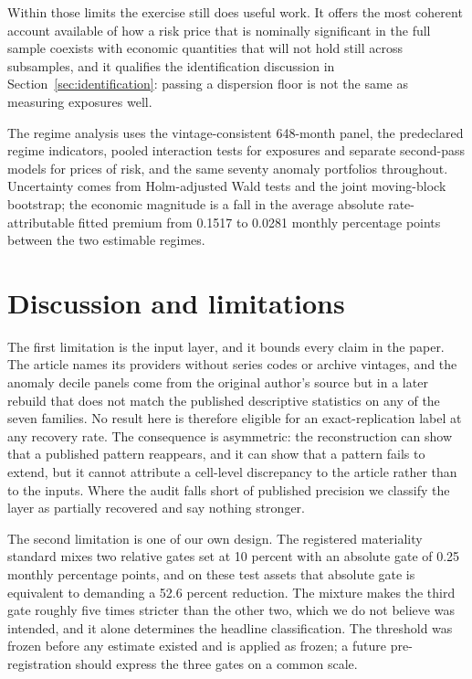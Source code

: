 \documentclass[11pt]{article}
\begin{document}
Within those limits the exercise still does useful work. It offers the most
coherent account available of how a risk price that is nominally significant in
the full sample coexists with economic quantities that will not hold still across
subsamples, and it qualifies the identification discussion in
Section~\ref{sec:identification}: passing a dispersion floor is not the same as
measuring exposures well.

The regime analysis uses the vintage-consistent 648-month panel, the predeclared %
regime indicators, pooled interaction tests for exposures and separate
second-pass models for prices of risk, and the same seventy anomaly portfolios
throughout. Uncertainty comes from Holm-adjusted Wald tests and the joint
moving-block bootstrap; the economic magnitude is a fall in the average absolute
rate-attributable fitted premium from 0.1517 to 0.0281 monthly percentage points %
between the two estimable regimes. %

\section{Discussion and limitations}
\label{sec:discussion}

The first limitation is the input layer, and it bounds every claim in the paper.
The article names its providers without series codes or archive vintages, and the
anomaly decile panels come from the original author's source but in a later
rebuild that does not match the published descriptive statistics on any of the
seven families. No result here is therefore eligible for an exact-replication
label at any recovery rate. The consequence is asymmetric: the reconstruction can
show that a published pattern reappears, and it can show that a pattern fails to
extend, but it cannot attribute a cell-level discrepancy to the article rather
than to the inputs. Where the audit falls short of published precision we
classify the layer as partially recovered and say nothing stronger.

The second limitation is one of our own design. The registered materiality
standard mixes two relative gates set at 10 percent with an absolute gate of 0.25 %
monthly percentage points, and on these test assets that absolute gate is
equivalent to demanding a 52.6 percent reduction. The mixture makes the third %
gate roughly five times stricter than the other two, which we do not believe was
intended, and it alone determines the headline classification. The threshold was
frozen before any estimate existed and is applied as frozen; a future
pre-registration should express the three gates on a common scale.
\end{document}
